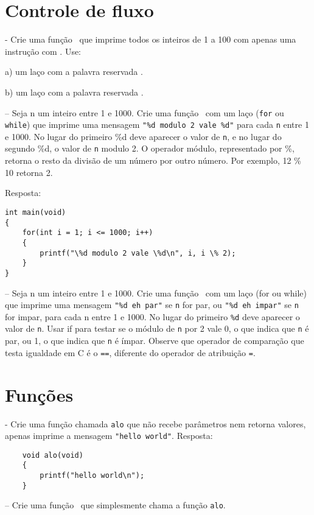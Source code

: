 \zeraquest

\section{Controle de fluxo}

\quest - Crie uma função \MAIN\ que imprime todos os inteiros de 1 a 100 com apenas uma instrução com \PRINTF. Use:

	a) um laço com a palavra reservada \WHILE.

	b) um laço com a palavra reservada \FOR.

\NEWLINE
\quest – Seja n um inteiro entre 1 e 1000. Crie uma função \MAIN\ com um laço ({\tt for} ou {\tt while}) que imprime uma mensagem \verb|"%d modulo 2 vale %d"| para cada {\tt n} entre 1 e 1000. No lugar do primeiro \%d deve aparecer o valor de {\tt n}, e no lugar do segundo \%d, o valor de {\tt n} modulo 2. O operador módulo, representado por \%, retorna o resto da divisão de um número por outro número. Por exemplo, 12 \% 10 retorna 2.

\NEWLINE
	Resposta:

\begin{lstlisting}
int main(void)
{
    for(int i = 1; i <= 1000; i++)
    {
        printf("\%d modulo 2 vale \%d\n", i, i \% 2);
    }
}
\end{lstlisting}
\NEWLINE
\quest – Seja n um inteiro entre 1 e 1000. Crie uma função \MAIN\ com um laço (for ou while) que imprime uma mensagem \verb|"%d eh par"| se {\tt n} for par, ou \verb|"%d eh impar"| se {\tt n} for impar, para cada n entre 1 e 1000. No lugar do primeiro \verb|%d| deve aparecer o valor de {\tt n}. Usar if para testar se o módulo de {\tt n} por 2 vale 0, o que indica que {\tt n} é par, ou 1, o que indica que {\tt n} é ímpar. Observe que operador de comparação que testa igualdade em C é o {\tt ==}, diferente do operador de atribuição {\tt =}.



\zeraquest

\section{Funções}

\quest - Crie uma função chamada {\tt alo} que não recebe parâmetros nem retorna valores, apenas imprime a mensagem \verb|"hello world"|.
	Resposta:
\begin{lstlisting}
	void alo(void)
	{
		printf("hello world\n");
	}
\end{lstlisting}
\NEWLINE
\quest – Crie uma função \MAIN\ que simplesmente chama a função {\tt alo}.

